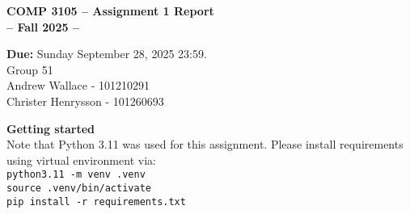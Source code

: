 \documentclass[12pt]{article}
\begin{document}
 

\begin{center} \Large\bf
COMP 3105 -- Assignment 1 Report\\
-- Fall 2025 -- 
\end{center} 

\begin{center}
{\bf Due:} Sunday September 28, 2025 23:59. \\
Group 51 \\
Andrew Wallace - 101210291\\
Christer Henrysson - 101260693\\[1em]
\end{center}
\textbf{Getting started} \\
Note that Python 3.11 was used for this assignment. Please install requirements using virtual environment via: \\
  \texttt{python3.11 -m venv .venv} \\
  \texttt{source .venv/bin/activate} \\
  \texttt{pip install -r requirements.txt}
\vspace{0.5em}
\newpage 
\end{document}
